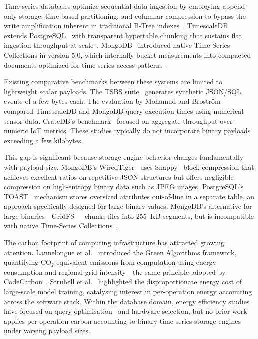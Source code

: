 \documentclass[conference]{IEEEtran}
\begin{document}
Time-series databases optimize sequential data ingestion by employing append-only storage, time-based partitioning, and columnar compression to bypass the write amplification inherent in traditional B-Tree indexes~\cite{dewaal_timeseries_survey,jensen_tsms_survey}. TimescaleDB~\cite{timescaledb_official} extends PostgreSQL~\cite{postgresql_official} with transparent hypertable chunking that sustains flat ingestion throughput at scale~\cite{dewaal_timeseries_survey,nerc_tsdb_survey}. MongoDB~\cite{mongodb_official} introduced native Time-Series Collections in version 5.0, which internally bucket measurements into compacted documents optimized for time-series access patterns~\cite{mongodb_timeseries_collections_guide,mongodb_ts_best_practices}.

Existing comparative benchmarks between these systems are limited to lightweight scalar payloads. The TSBS suite~\cite{tsbs} generates synthetic JSON/SQL events of a few bytes each. The evaluation by Mohamud and Broström~\cite{diva_timescaledb_mongodb_eval} compared TimescaleDB and MongoDB query execution times using numerical sensor data. CrateDB's benchmark~\cite{cratedb_ts_benchmark} focused on aggregate throughput over numeric IoT metrics. These studies typically do not incorporate binary payloads exceeding a few kilobytes.

This gap is significant because storage engine behavior changes fundamentally with payload size. MongoDB's WiredTiger~\cite{mongodb_wiredtiger_storage} uses Snappy~\cite{google_snappy} block compression that achieves excellent ratios on repetitive JSON structures but offers negligible compression on high-entropy binary data such as JPEG images. PostgreSQL's TOAST~\cite{postgresql_toast_docs} mechanism stores oversized attributes out-of-line in a separate table, an approach specifically designed for large binary values. MongoDB's alternative for large binaries---GridFS~\cite{mongodb_gridfs}---chunks files into 255~KB segments, but is incompatible with native Time-Series Collections~\cite{mongodb_ts_limitations}.

The carbon footprint of computing infrastructure has attracted growing attention. Lannelongue et al.~\cite{lannelongue_green_algorithms} introduced the Green Algorithms framework, quantifying CO$_2$-equivalent emissions from computation using energy consumption and regional grid intensity---the same principle adopted by CodeCarbon~\cite{codecarbon}. Strubell et al.~\cite{strubell_energy_nlp} highlighted the disproportionate energy cost of large-scale model training, catalysing interest in per-operation energy accounting across the software stack. Within the database domain, energy efficiency studies have focused on query optimisation~\cite{nerc_tsdb_survey} and hardware selection, but no prior work applies per-operation carbon accounting to binary time-series storage engines under varying payload sizes.
\end{document}
